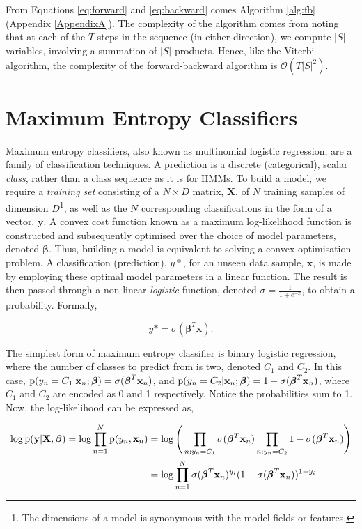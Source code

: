 From Equations \ref{eq:forward} and \ref{eq:backward} comes Algorithm \ref{alg:fb} (Appendix \ref{AppendixA}). The complexity of the algorithm comes from noting that at each of the $T$ steps in the sequence (in either direction), we compute $|S|$ variables, involving a summation of $|S|$ products. Hence, like the Viterbi algorithm, the complexity of the forward-backward algorithm is $\mathcal{O}(T|S|^2)$.

\section{Maximum Entropy Classifiers}

Maximum entropy classifiers, also known as multinomial logistic regression, are a family of classification techniques.  A prediction is a discrete (categorical), scalar \emph{class}, rather than a class sequence as it is for HMMs. To build a model, we require a \emph{training set} consisting of a $N \times D$ matrix, $\mathbf{X}$, of $N$ training samples of dimension $D$\footnote{The dimensions of a model is synonymous with the model fields or features.}, as well as the $N$ corresponding classifications in the form of a vector, $\mathbf{y}$. A convex cost function known as a maximum log-likelihood function is constructed and subsequently optimised over the choice of model parameters, denoted $\boldsymbol\beta$. Thus, building a model is equivalent to solving a convex optimisation problem. A classification (prediction), $y*$, for an unseen data sample, $\mathbf{x}$, is made by employing these optimal model parameters in a linear function. The result is then passed through a non-linear \emph{logistic} function, denoted $\sigma = \frac{1}{1 + e^{-x}}$, to obtain a probability. Formally,

\begin{equation}
y* = \sigma(\boldsymbol\beta^T\mathbf{x}).
\label{eq:logisticprediction}
\end{equation}

The simplest form of maximum entropy classifier is binary logistic regression, where the number of classes to predict from is two, denoted $C_1$ and $C_2$. In this case, $\text{p}(y_n = C_1|\mathbf{x}_n;\boldsymbol\beta) = \sigma(\boldsymbol\beta^T\mathbf{x}_n)$, and $\text{p}(y_n = C_2|\mathbf{x}_n;\boldsymbol\beta) = 1 - \sigma(\boldsymbol\beta^T\mathbf{x}_n)$, where $C_1$ and $C_2$ are encoded as 0 and 1 respectively. Notice the probabilities sum to 1. Now, the log-likelihood can be expressed as,

\begin{equation}
\begin{aligned}
\log\text{p}(\mathbf{y}|\mathbf{X}, \boldsymbol\beta) = \log\prod_{n=1}^N \text{p}(y_n, \mathbf{x}_n)
&= \log\Bigg(\prod_{n:y_n = C_1} \sigma(\boldsymbol\beta^T\mathbf{x}_n) \prod_{n:y_n = C_2} 1 - \sigma(\boldsymbol\beta^T\mathbf{x}_n)\Bigg) \\
&=  \log\prod_{n = 1}^N \sigma(\boldsymbol\beta^T\mathbf{x}_n)^{y_i}(1 - \sigma(\boldsymbol\beta^T\mathbf{x}_n))^{1 - y_i}
\end{aligned}
\label{eq:logistic2}
\end{equation}

